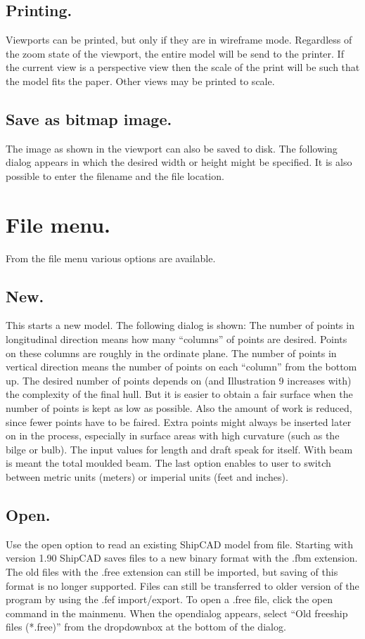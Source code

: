 \documentclass[12pt]{article}
\begin{document}
\subsection{Printing.}
Viewports can be printed, but only if they are in wireframe mode. Regardless of the zoom state of
the viewport, the entire model will be send to the printer. If the current view is a perspective view
then the scale of the print will be such that the model fits the paper. Other views may be printed to
scale.

\subsection{Save as bitmap image.}
The image as shown in the viewport can also be
saved to disk. The following dialog appears in which
the desired width or height might be specified. It is
also possible to enter the filename and the file
location.

\section{File menu.}
From the file menu various options are available.

\subsection{New.}
This starts a new model. The following dialog is shown:
The number of points in longitudinal
direction means how many “columns” of
points are desired. Points on these
columns are roughly in the ordinate plane.
The number of points in vertical direction
means the number of points on each
“column” from the bottom up. The desired
number of points depends on (and
 Illustration 9
increases with) the complexity of the final hull. But it is easier to obtain a fair surface when the
number of points is kept as low as possible. Also the amount of work is reduced, since fewer points
have to be faired. Extra points might always be inserted later on in the process, especially in surface
areas with high curvature (such as the bilge or bulb). The input values for length and draft speak for
itself. With beam is meant the total moulded beam. The last option enables to user to switch
between metric units (meters) or imperial units (feet and inches).

\subsection{Open.}
Use the open option to read an existing ShipCAD model from file. Starting with version 1.90
ShipCAD saves files to a new binary format with the .fbm extension. The old files with the .free
extension can still be imported, but saving of this format is no longer supported. Files can still be
transferred to older version of the program by using the .fef import/export. To open a .free file, click
the open command in the mainmenu. When the opendialog appears, select “Old freeship files
(*.free)” from the dropdownbox at the bottom of the dialog.
\end{document}
